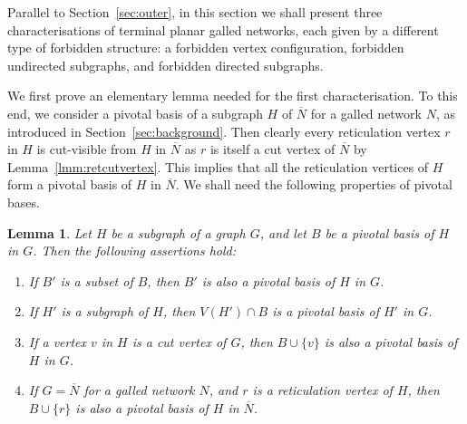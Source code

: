\documentclass[pdflatex,sn-mathphys-num]{sn-jnl}
\theoremstyle{thmstyleone}%
\theoremstyle{thmstyletwo}%
\newtheorem{lemma}{Lemma}
\theoremstyle{thmstylethree}%
\begin{document}
Parallel to Section~\ref{sec:outer}, 
in this section we shall present three characterisations of terminal planar galled networks, each given by a different type of forbidden structure: a forbidden vertex configuration, forbidden undirected subgraphs, and forbidden directed subgraphs.


We first prove an elementary lemma needed for the first characterisation.
To this end, we consider a pivotal basis of a subgraph $H$ of $\overline{N}$ for a galled network $N$, as introduced in Section~\ref{sec:background}. Then clearly every reticulation vertex $r$ in $H$ is cut-visible from $H$ in $\overline{N}$ as $r$ is itself a cut vertex of $\overline{N}$ by Lemma~\ref{lmm:retcutvertex}. This implies that all the reticulation vertices of $H$ form a pivotal basis of $H$ in $\overline{N}$.
We shall need the following properties of pivotal bases.

\begin{lemma}\label{lmm:cut-visible-basic}
Let $H$ be a subgraph of a graph $G$, and let $B$ be a pivotal basis of $H$ in $G$. Then the following assertions hold:
\begin{enumerate}
\item[(i)] If $B'$ is a subset of $B$, then  $B'$ is also a pivotal basis of $H$ in $G$.
\item[(ii)] If $H'$ is a subgraph of $H$, then $V(H')\cap B$ is a pivotal basis of  $H'$ in $G$.
\item[(iii)] If a vertex $v$ in $H$ is a cut vertex of $G$,   then $B \cup \{v\}$ is also a pivotal basis of $H$ in $G$. 
\item[(iv)] If $G=\overline{N}$ for a galled network $N$, and $r$ is a reticulation vertex of $H$, then $B\cup\{r\}$ is also a pivotal basis of $H$ in $\overline{N}$.
\end{enumerate}
\end{lemma}
\end{document}
